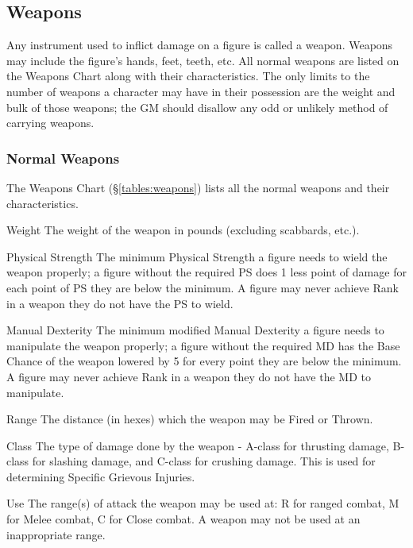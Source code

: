 \begin{multicols*}{3}
\subsection{Weapons}

Any instrument used to inflict damage on a figure is called a weapon.
Weapons may include the figure's hands, feet, teeth, etc.  All normal
weapons are listed on the Weapons Chart along with their
characteristics. The only limits to the number of weapons a character
may have in their possession are the weight and bulk of those weapons;
the GM should disallow any odd or unlikely method of carrying weapons.

\subsubsection{Normal Weapons}

The Weapons Chart (\S \ref{tables:weapons}) lists all the normal
weapons and their characteristics.

\begin{Description}

\item[Weight] The weight of the weapon in pounds (excluding scabbards,
etc.).

\item[Physical Strength] The minimum Physical Strength a figure needs
to wield the weapon properly; a figure without the required PS does 1
less point of damage for each point of PS they are below the
minimum. A figure may never achieve Rank in a weapon they do not have
the PS to wield.

\item[Manual Dexterity] The minimum modified Manual Dexterity a figure
needs to manipulate the weapon properly; a figure without the required
MD has the Base Chance of the weapon lowered by 5 for every point they
are below the minimum. A figure may never achieve Rank in a weapon
they do not have the MD to manipulate.

\item[Range] The distance (in hexes) which the weapon may be Fired or
Thrown.

\item[Class] The type of damage done by the weapon - A-class for
thrusting damage, B-class for slashing damage, and C-class for
crushing damage. This is used for determining Specific Grievous
Injuries.

\item[Use] The range(s) of attack the weapon may be used at: R for
ranged combat, M for Melee combat, C for Close combat. A weapon may
not be used at an inappropriate range.


\end{Description}
\end{multicols*}
